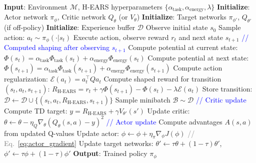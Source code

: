 \documentclass[journal]{IEEEtran}
\begin{document}
	\begin{algorithm}[htbp]
		\caption{Actor-Critic Algorithm with H-EARS Integration}
		\label{alg:hears_ac}
		\begin{algorithmic}[1]
			\STATE \textbf{Input}: Environment $\mathcal{M}$, H-EARS hyperparameters $\{\alpha_{\text{task}}, \alpha_{\text{energy}}, \lambda\}$
			\STATE \textbf{Initialize}: Actor network $\pi_\phi$, Critic network $Q_\theta$ (or $V_\theta$)
			\STATE \textbf{Initialize}: Target networks $\pi_{\phi'}$, $Q_{\theta'}$ (if off-policy)
			\STATE \textbf{Initialize}: Experience buffer $\mathcal{D}$
			\STATE Observe initial state $s_0$
			\STATE Sample action: $a_t \sim \pi_\phi(\cdot | s_t)$
			\STATE Execute action, observe reward $r_t$ and next state $s_{t+1}$
			\STATE \textcolor{blue}{// Computed shaping after observing $s_{t+1}$}
			\STATE Compute potential at current state: $\Phi(s_t) = \alpha_{\text{task}}\Phi_{\text{task}}(s_t) + \alpha_{\text{energy}}\Phi_{\text{energy}}(s_t)$
			\STATE Compute potential at next state: $\Phi(s_{t+1}) = \alpha_{\text{task}}\Phi_{\text{task}}(s_{t+1}) + \alpha_{\text{energy}}\Phi_{\text{energy}}(s_{t+1})$
			\STATE Compute action regularization: $\mathcal{E}(a_t) = a_t^\top Q a_t$
			\STATE Compute shaped reward for transition $(s_t, a_t, s_{t+1})$: 
			\STATE \quad $R_{\text{H-EARS}} = r_t + \gamma\Phi(s_{t+1}) - \Phi(s_t) - \lambda\mathcal{E}(a_t)$
			\STATE 
			\STATE Store transition: $\mathcal{D} \leftarrow \mathcal{D} \cup \{(s_t, a_t, R_{\text{H-EARS}}, s_{t+1})\}$
			\STATE 
			\STATE Sample minibatch $\mathcal{B} \sim \mathcal{D}$
			\STATE \textcolor{blue}{// Critic update}
			\STATE Compute TD target: $y = R_{\text{H-EARS}} + \gamma V_{\theta'}(s')$
			\STATE Update critic: $\theta \leftarrow \theta - \eta_Q \nabla_\theta (Q_\theta(s,a) - y)^2$
			\ENDFOR
			\STATE \textcolor{blue}{// Actor update}
			\STATE Compute advantages $A(s,a)$ from updated Q-values
			\STATE Update actor: $\phi \leftarrow \phi + \eta_\pi \nabla_\phi J(\phi)$ \textcolor{gray}{// Eq.~\eqref{eq:actor_gradient}}
			\STATE 
			\STATE Update target networks: $\theta' \leftarrow \tau\theta + (1-\tau)\theta'$, $\phi' \leftarrow \tau\phi + (1-\tau)\phi'$
			\ENDIF
			\ENDFOR
			\ENDFOR
			\STATE \textbf{Output}: Trained policy $\pi_\phi$
		\end{algorithmic}
	\end{algorithm}
	
\end{document}
